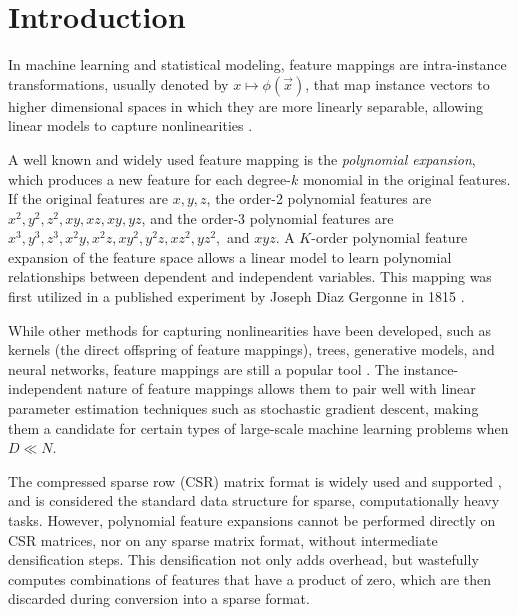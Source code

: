 \documentclass[journal]{journal}
\begin{document}
%
\IEEEpeerreviewmaketitle


\section{Introduction}

In machine learning and statistical modeling, feature mappings are intra-instance transformations, usually denoted by $x \mapsto \phi(\vec{x})$, that map instance vectors to higher dimensional spaces in which they are more linearly separable, allowing linear models to capture nonlinearities \cite{yuan2012recent}.

A well known and widely used feature mapping is the \emph{polynomial expansion}, which produces a new feature for each degree-$k$ monomial in the original features.
If the original features are $x,y,z$, the order-2 polynomial features are $x^2, y^2, z^2, xy, xz, xy, yz$, and the order-3 polynomial features are $x^3, y^3, z^3, x^2y, x^2z, xy^2, y^2 z, xz^2, yz^2,$ and $xyz$.
A $K$-order polynomial feature expansion of the feature space allows a linear model to learn polynomial relationships between dependent and independent variables.
This mapping was first utilized in a published experiment by Joseph Diaz Gergonne in 1815 \cite{gergonne1974application, smith1918standard}.

While other methods for capturing nonlinearities have been developed, such as kernels (the direct offspring of feature mappings), trees, generative models, and neural networks, feature mappings are still a popular tool \cite{barker200114, chang2010training, shaw2006intellectual}.
The instance-independent nature of feature mappings allows them to pair well with linear parameter estimation techniques such as stochastic gradient descent, making them a candidate for certain types of large-scale machine learning problems when $D \ll N$.

The compressed sparse row (CSR) matrix format \cite{saad1994sparskit} is widely used \cite{liu2012sparse, bulucc2009parallel, bell2008efficient, white1997improving} and supported \cite{eigenweb, bastien2012theano, scikit-learn, koenker2003sparsem}, and is considered the standard data structure for sparse, computationally heavy tasks.
However, polynomial feature expansions cannot be performed directly on CSR matrices, nor on any sparse matrix format, without intermediate densification steps.
This densification not only adds overhead, but wastefully computes combinations of features that have a product of zero, which are then discarded during conversion into a sparse format.
\end{document}
